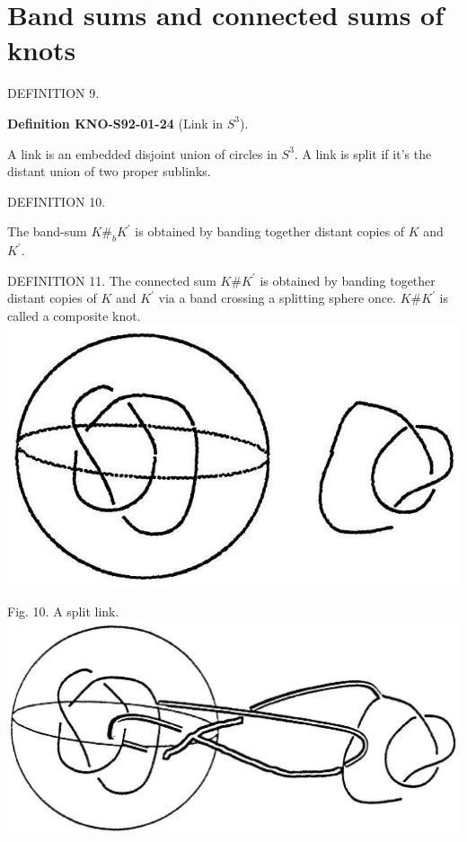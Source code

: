 \documentclass[10pt, letterpaper]{article}
\newcommand{\CustomHeading}[3]{%
  \par\medskip\noindent%
  \textbf{#1 #2} \textnormal{(#3)}.\enskip%
}
\newenvironment{DEF}[2]{\begin{unitbox}\CustomHeading{Definition}{#1}{#2}}{\end{unitbox}}
\begin{document}
\section{Band sums and connected sums of knots}

DEFINITION 9. 

\begin{DEF}{KNO-S92-01-24}{Link in $S^3$}
A link is an embedded disjoint union of circles in $S^{3}$. A link is split if it's the distant union of two proper sublinks.
\end{DEF}

DEFINITION 10. 

The band-sum $K \#_{b} K^{\prime}$ is obtained by banding together distant copies of $K$ and $K^{\prime}$.

DEFINITION 11. The connected sum $K \# K^{\prime}$ is obtained by banding together distant copies of $K$ and $K^{\prime}$ via a band crossing a splitting sphere once. $K \# K^{\prime}$ is called a composite knot.\\
\includegraphics[scale=0.2, center]{2025_05_21_037de704f595ce642d3eg-083(1)}

Fig. 10. A split link.\\
\includegraphics[scale=0.2, center]{2025_05_21_037de704f595ce642d3eg-083(2)}
\end{document}
